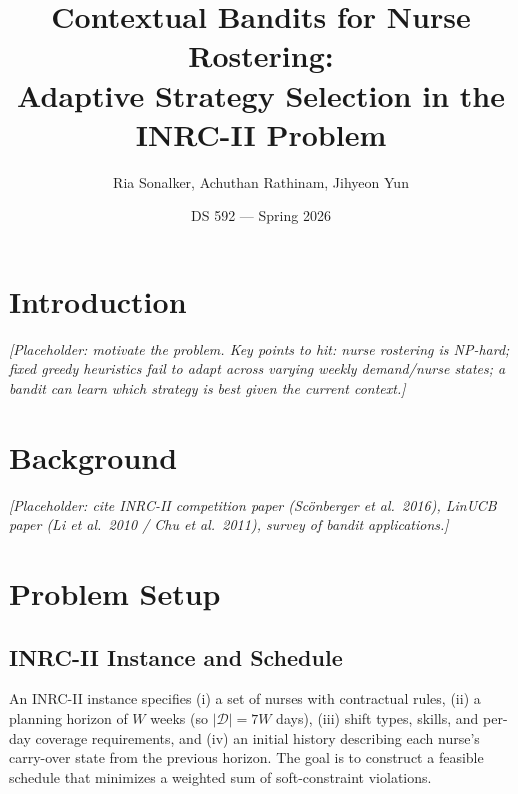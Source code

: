 \documentclass[11pt]{article}
\title{Contextual Bandits for Nurse Rostering:\\
       Adaptive Strategy Selection in the INRC-II Problem}
\author{Ria Sonalker, Achuthan Rathinam, Jihyeon Yun}
\date{DS 592 --- Spring 2026}
\begin{document}
\maketitle

\section{Introduction}


\noindent\textit{[Placeholder: motivate the problem. Key points to hit:
nurse rostering is NP-hard; fixed greedy heuristics fail to adapt across
varying weekly demand/nurse states; a bandit can learn which strategy is
best given the current context.]}


\section{Background}


\noindent\textit{[Placeholder: cite INRC-II competition paper
(Sc\"onberger et al.\ 2016), LinUCB paper (Li et al.\ 2010 / Chu et
al.\ 2011), survey of bandit applications.]}

\section{Problem Setup}

\subsection{INRC-II Instance and Schedule}

An INRC-II instance specifies (i) a set of nurses with contractual rules,
(ii) a planning horizon of $W$ weeks (so $|\mathcal{D}| = 7W$ days),
(iii) shift types, skills, and per-day coverage requirements, and
(iv) an initial history describing each nurse's carry-over state from the
previous horizon. The goal is to construct a feasible schedule that
minimizes a weighted sum of soft-constraint violations.
\end{document}

